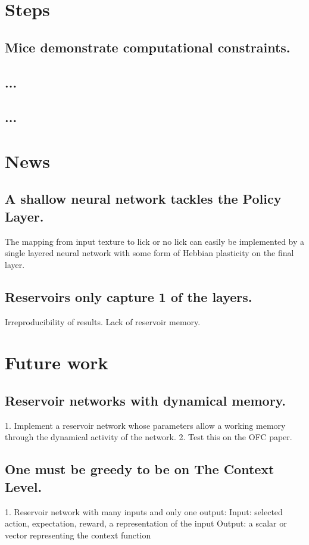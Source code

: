 \documentclass[]{article}
\begin{document}
\section{Steps}

\subsection{Mice demonstrate computational constraints.}


\subsection{...}

\subsection{...}

\section{News}

\subsection{A shallow neural network tackles the Policy Layer.}
The mapping from input texture to lick or no lick can easily be implemented by a single layered neural network with some form of Hebbian plasticity on the final layer.

\subsection{Reservoirs only capture 1 of the layers.}
Irreproducibility of results.
Lack of reservoir memory.

\section{Future work}

\subsection{Reservoir networks with dynamical memory.}
1. Implement a reservoir network whose parameters allow a working memory through the dynamical activity of the network.
2. Test this on the OFC paper.

\subsection{One must be greedy to be on The Context Level.}
1. Reservoir network with many inputs and only one output:
Input: selected action, expectation, reward, a representation of the input
Output: a scalar or vector representing the context function
\end{document}
